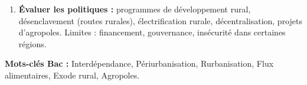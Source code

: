 \documentclass[11pt]{article}
\newcommand{\cle}[1]{{\popxbold\color{popdark}#1}}
\begin{document}
\begin{methode}
\begin{enumerate}
\begin{itemize}
        \item \textbf{Agriculture urbaine et périurbaine :} maraîchage dans les bas-fonds (vallée du Mfoundi à Yaoundé ; bas-fonds de Douala), élevage porcin et avicole en ville. Réponse à l'insécurité alimentaire et revenu complémentaire, mais risques sanitaires (eaux usées, pesticides).
    \end{itemize}
    \item \textbf{Évaluer les politiques :} programmes de développement rural, désenclavement (routes rurales), électrification rurale, décentralisation, projets d'agropoles. Limites : financement, gouvernance, insécurité dans certaines régions.
\end{enumerate}
\textbf{Mots-clés Bac :} \cle{Interdépendance}, \cle{Périurbanisation}, \cle{Rurbanisation}, \cle{Flux alimentaires}, \cle{Exode rural}, \cle{Agropoles}.
\end{methode}
\end{document}
